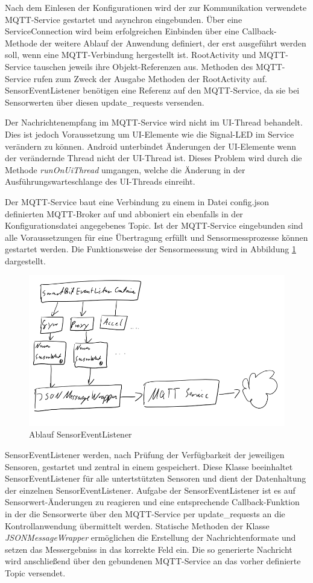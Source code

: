 \documentclass[11pt,a4paper]{report}
\begin{document}
Nach dem Einlesen der Konfigurationen wird der zur Kommunikation verwendete MQTT-Service gestartet und asynchron eingebunden.
Über eine ServiceConnection wird beim erfolgreichen Einbinden über eine Callback-Methode der weitere Ablauf der Anwendung definiert, der erst ausgeführt werden soll, wenn eine MQTT-Verbindung hergestellt ist.
RootActivity und MQTT-Service tauschen jeweils ihre Objekt-Referenzen aus.
Methoden des MQTT-Service rufen zum Zweck der Ausgabe Methoden der RootActivity auf.
SensorEventListener benötigen eine Referenz auf den MQTT-Service, da sie bei Sensorwerten über diesen update\_requests versenden.

Der Nachrichtenempfang im MQTT-Service wird nicht im UI-Thread behandelt.
Dies ist jedoch Voraussetzung um UI-Elemente wie die Signal-LED im Service verändern zu können.
Android unterbindet Änderungen der UI-Elemente wenn der verändernde Thread nicht der UI-Thread ist.
Dieses Problem wird durch die Methode \textit{runOnUiThread} umgangen, welche die Änderung in der Ausführungswarteschlange des UI-Threads einreiht.

Der MQTT-Service baut eine Verbindung zu einem in Datei config.json definierten MQTT-Broker auf und abboniert ein ebenfalls in der Konfigurationsdatei angegebenes Topic.
Ist der MQTT-Service eingebunden sind alle Voraussetzungen für eine Übertragung erfüllt und  Sensormessprozesse können gestartet werden.
Die Funktionsweise der Sensormeessung wird in Abbildung \ref{fig:sensor_event_listener} dargestellt.
\begin{figure}[htbp]
  \centering
  \includegraphics[width=.8\textwidth]{images/sensor_event_listener.png}
  \caption{Ablauf SensorEventListener}
  \label{fig:sensor_event_listener}
\end{figure}
SensorEventListener werden, nach Prüfung der Verfügbarkeit der jeweiligen Sensoren, gestartet und zentral in einem  gespeichert.
Diese Klasse beeinhaltet SensorEventListener für alle untertstützten Sensoren und dient der Datenhaltung der einzelnen SensorEventListener.
Aufgabe der SensorEventListener ist es auf Sensorwert-Änderungen zu reagieren und eine entsprechende Callback-Funktion in der die Sensorwerte über den MQTT-Service per update\_requests an die Kontrollanwendung übermittelt werden.
Statische Methoden der Klasse \textit{JSONMessageWrapper} ermöglichen die Erstellung der Nachrichtenformate und setzen das Messergebniss in das korrekte Feld ein.
Die so generierte Nachricht wird anschließend über den gebundenen MQTT-Service an das vorher definierte Topic versendet.
\end{document}
